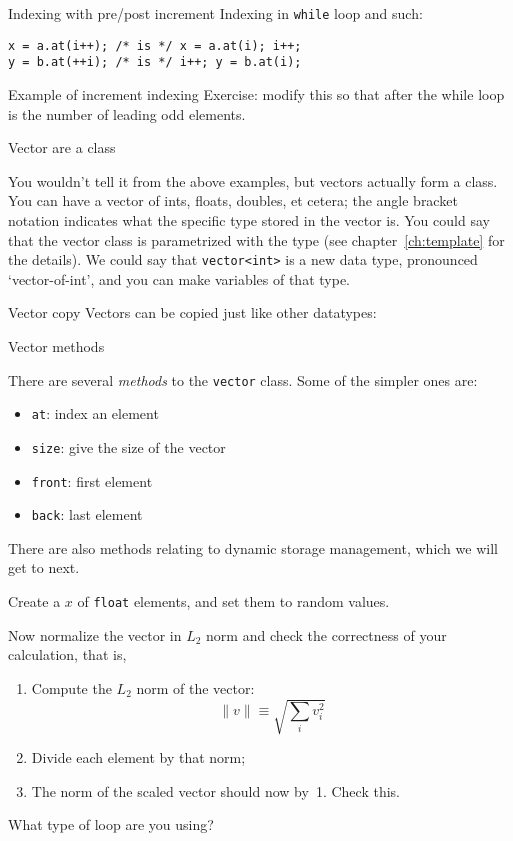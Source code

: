 \begin{block}{Indexing with pre/post increment}
  \label{sl:prepostindex}
Indexing in \lstinline{while} loop and such:
\begin{lstlisting}
x = a.at(i++); /* is */ x = a.at(i); i++;
y = b.at(++i); /* is */ i++; y = b.at(i);
\end{lstlisting}
\end{block}

\begin{block}{Example of increment indexing}
  Exercise: modify this so that after the while loop  is the
  number of leading odd elements.
\end{block}

 {Vector are a class}
\label{sec:stdvector}

You wouldn't tell it from the above examples, but vectors actually
form a  class. You can have a vector of ints,
floats, doubles, et cetera; 
the angle bracket notation indicates what the specific type stored in
the vector is.
You could say that the vector class is parametrized with the type (see
chapter~\ref{ch:template} for the details). We could say that
\lstinline{vector<int>} is a new data type, pronounced `vector-of-int', and you can
make variables of that type.

\begin{block}{Vector copy}
  \label{sl:vectorcopy}
  Vectors can be copied just like other datatypes:
\end{block}

 {Vector methods}

There are several \emph{methods}
to the \lstinline{vector} class. Some of the simpler ones are:
\begin{itemize}
\item \lstinline{at}: index an element
\item \lstinline{size}: give the size of the vector
\item \lstinline{front}: first element
\item \lstinline{back}: last element
\end{itemize}

There are also methods relating to dynamic storage management, which
we will get to next.

\begin{exercise}
  \label{ex:vectornormalize}
  Create a  $x$ of \lstinline{float} elements, and set them to random
  values.

  Now normalize the vector in $L_2$ norm and check the correctness of
  your calculation, that is,
  \begin{enumerate}
  \item Compute the $L_2$ norm of the vector:
    \[ \| v\| \equiv \sqrt{\sum_iv_i^2} \]
  \item Divide each element by that norm;
  \item The norm of the scaled vector should now by~1. Check this.
  \end{enumerate}
  What type of loop are you using?
\end{exercise}

